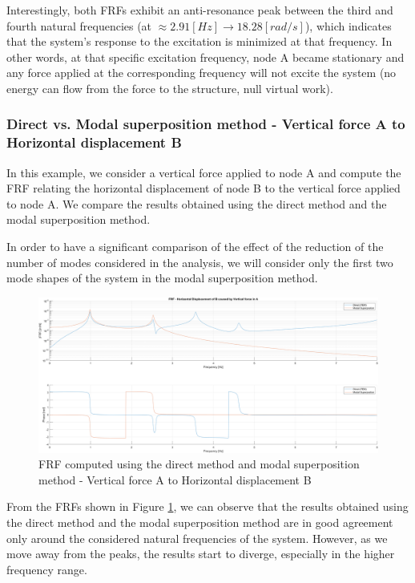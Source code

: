 Interestingly, both FRFs exhibit an anti-resonance peak between the third and fourth natural frequencies (at $\approx 2.91 [Hz] \rightarrow 18.28 [rad/s]$), which indicates that the system's response to the excitation is minimized at that frequency.
In other words, at that specific excitation frequency, node A became stationary and any force applied at the corresponding frequency will not excite the system (no energy can flow from the force to the structure, null virtual work).


\subsubsection{Direct vs. Modal superposition method - Vertical force A to Horizontal displacement B}
\label{subsubsec:direct_vs_modal_vertical_force_A}

In this example, we consider a vertical force applied to node A and compute the FRF relating the horizontal displacement of node B to the vertical force applied to node A.
We compare the results obtained using the direct method and the modal superposition method.

In order to have a significant comparison of the effect of the reduction of the number of modes considered in the analysis, we will consider only the first two mode shapes of the system in the modal superposition method.

\begin{figure}[H]
    \centering
    \includegraphics[width=\textwidth]{img/MATLAB/FRFs/Direct_vs_Modal.png}
    \caption{FRF computed using the direct method and modal superposition method - Vertical force A to Horizontal displacement B}
    \label{fig:FRF_direct_vs_modal_vertical_A}
\end{figure}

From the FRFs shown in Figure \ref{fig:FRF_direct_vs_modal_vertical_A}, we can observe that the results obtained using the direct method and the modal superposition method are in good agreement only around the considered natural frequencies of the system.
However, as we move away from the peaks, the results start to diverge, especially in the higher frequency range.

